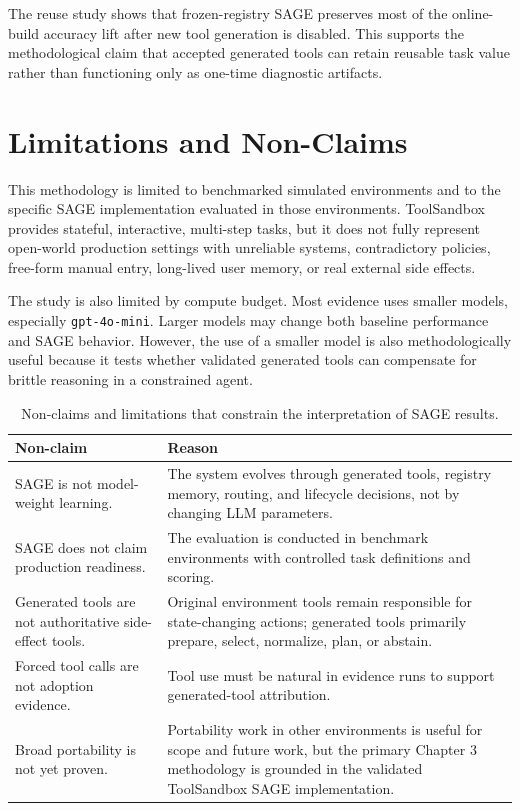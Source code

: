The reuse study shows that frozen-registry SAGE preserves most of the online-build accuracy lift after new tool generation is disabled. This supports the methodological claim that accepted generated tools can retain reusable task value rather than functioning only as one-time diagnostic artifacts.

\section{Limitations and Non-Claims}
\label{sec:sage_limitations_nonclaims}

This methodology is limited to benchmarked simulated environments and to the specific SAGE implementation evaluated in those environments. ToolSandbox provides stateful, interactive, multi-step tasks, but it does not fully represent open-world production settings with unreliable systems, contradictory policies, free-form manual entry, long-lived user memory, or real external side effects.

The study is also limited by compute budget. Most evidence uses smaller models, especially \texttt{gpt-4o-mini}. Larger models may change both baseline performance and SAGE behavior. However, the use of a smaller model is also methodologically useful because it tests whether validated generated tools can compensate for brittle reasoning in a constrained agent.

\begin{table}[H]
\centering
\footnotesize
\begin{tabularx}{\textwidth}{p{4.0cm} X}
\toprule
\textbf{Non-claim} & \textbf{Reason} \\
\midrule
SAGE is not model-weight learning. & The system evolves through generated tools, registry memory, routing, and lifecycle decisions, not by changing LLM parameters. \\
\addlinespace
SAGE does not claim production readiness. & The evaluation is conducted in benchmark environments with controlled task definitions and scoring. \\
\addlinespace
Generated tools are not authoritative side-effect tools. & Original environment tools remain responsible for state-changing actions; generated tools primarily prepare, select, normalize, plan, or abstain. \\
\addlinespace
Forced tool calls are not adoption evidence. & Tool use must be natural in evidence runs to support generated-tool attribution. \\
\addlinespace
Broad portability is not yet proven. & Portability work in other environments is useful for scope and future work, but the primary Chapter 3 methodology is grounded in the validated ToolSandbox SAGE implementation. \\
\bottomrule
\end{tabularx}
\caption{Non-claims and limitations that constrain the interpretation of SAGE results.}
\label{tab:sage_nonclaims}
\end{table}

